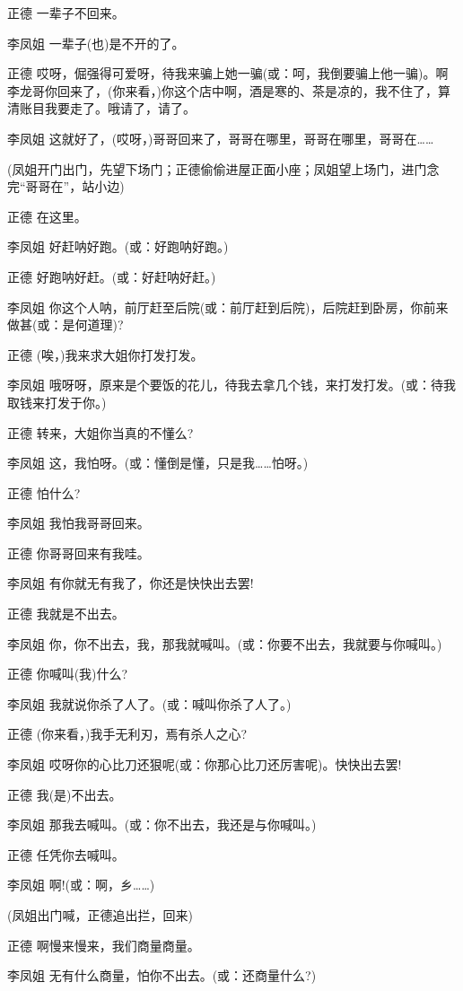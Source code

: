 正德 一辈子不回来。

李凤姐 一辈子(也)是不开的了。

正德
哎呀，倔强得可爱呀，待我来骗上她一骗(或：呵，我倒要骗上他一骗)。啊李龙哥你回来了，(你来看，)你这个店中啊，酒是寒的、茶是凉的，我不住了，算清账目我要走了。哦请了，请了。

李凤姐
这就好了，(哎呀，)哥哥回来了，哥哥在哪里，哥哥在哪里，哥哥在\ldots{}\ldots{}

(凤姐开门出门，先望下场门；正德偷偷进屋正面小座；凤姐望上场门，进门念完``哥哥在''，站小边)

正德 在这里。

李凤姐 好赶呐好跑。(或：好跑呐好跑。)

正德 好跑呐好赶。(或：好赶呐好赶。)

李凤姐
你这个人呐，前厅赶至后院(或：前厅赶到后院)，后院赶到卧房，你前来做甚(或：是何道理)?

正德 (唉，)我来求大姐你打发打发。

李凤姐
哦呀呀，原来是个要饭的花儿，待我去拿几个钱，来打发打发。(或：待我取钱来打发于你。)

正德 转来，大姐你当真的不懂么?

李凤姐 这，我怕呀。(或：懂倒是懂，只是我\ldots{}\ldots{}怕呀。)

正德 怕什么?

李凤姐 我怕我哥哥回来。

正德 你哥哥回来有我哇。

李凤姐 有你就无有我了，你还是快快出去罢!

正德 我就是不出去。

李凤姐 你，你不出去，我，那我就喊叫。(或：你要不出去，我就要与你喊叫。)

正德 你喊叫(我)什么?

李凤姐 我就说你杀了人了。(或：喊叫你杀了人了。)

正德 (你来看，)我手无利刃，焉有杀人之心?

李凤姐 哎呀你的心比刀还狠呢(或：你那心比刀还厉害呢)。快快出去罢!

正德 我(是)不出去。

李凤姐 那我去喊叫。(或：你不出去，我还是与你喊叫。)

正德 任凭你去喊叫。

李凤姐 啊!(或：啊，乡\ldots{}\ldots{})

(凤姐出门喊，正德追出拦，回来)

正德 啊慢来慢来，我们商量商量。

李凤姐 无有什么商量，怕你不出去。(或：还商量什么?)

